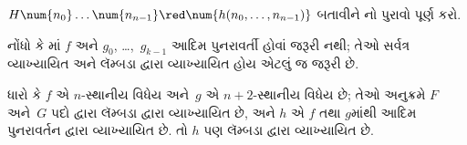 \begin{prob}
  $H\num{n_0}\dots\num{n_{n-1}} \red \num{h(n_0, \dots,
    n_{n-1})}$ બતાવીને
  નો પુરાવો પૂર્ણ કરો.
\end{prob}

નોંધો કે માં $f$ અને $g_0$,
\dots,~$g_{k-1}$ આદિમ પુનરાવર્તી હોવાં જરૂરી
નથી; તેઓ સર્વત્ર વ્યાખ્યાયિત અને લૅમ્બડા દ્વારા વ્યાખ્યાયિત
હોય એટલું જ જરૂરી છે.

\begin{lem}
  ધારો કે $f$ એ $n$-સ્થાનીય વિધેય અને~$g$ એ
  $n+2$-સ્થાનીય વિધેય છે; તેઓ અનુક્રમે
  $F$ અને~$G$ પદો દ્વારા લૅમ્બડા દ્વારા વ્યાખ્યાયિત છે,
  અને $h$ એ $f$ તથા $g$માંથી આદિમ
  પુનરાવર્તન દ્વારા વ્યાખ્યાયિત છે. તો $h$ પણ
  લૅમ્બડા દ્વારા વ્યાખ્યાયિત છે.
\end{lem}

